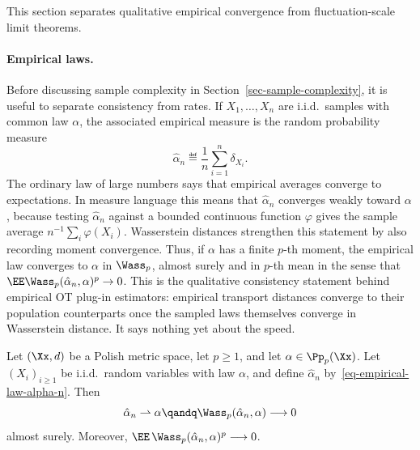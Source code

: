 This section separates qualitative empirical convergence from fluctuation-scale limit theorems.

\paragraph{Empirical laws.}
Before discussing sample complexity in Section~\ref{sec-sample-complexity}, it is useful to separate consistency from rates. If \(X_1,\ldots,X_n\) are i.i.d.\ samples with common law \(\alpha\), the associated empirical measure is the random probability measure
\begin{equation}\label{eq-empirical-law-alpha-n}
	\hat\alpha_n \eqdef \frac1n\sum_{i=1}^n\delta_{X_i}.
\end{equation}
The ordinary law of large numbers says that empirical averages converge to expectations. In measure language this means that \(\hat\alpha_n\) converges weakly toward \(\alpha\), because testing \(\hat\alpha_n\) against a bounded continuous function \(\varphi\) gives the sample average \(n^{-1}\sum_i\varphi(X_i)\). Wasserstein distances strengthen this statement by also recording moment convergence. Thus, if \(\alpha\) has a finite \(p\)-th moment, the empirical law converges to \(\alpha\) in \(\Wass_p\), almost surely and in \(p\)-th mean in the sense that \(\EE\Wass_p(\hat\alpha_n,\alpha)^p\to0\). This is the qualitative consistency statement behind empirical OT plug-in estimators: empirical transport distances converge to their population counterparts once the sampled laws themselves converge in Wasserstein distance. It says nothing yet about the speed.

\begin{prop}\label{prop-empirical-lln-wasserstein}
	Let \((\Xx,d)\) be a Polish metric space, let \(p\geq1\), and let \(\alpha\in\Pp_p(\Xx)\). Let \((X_i)_{i\geq1}\) be i.i.d.\ random variables with law \(\alpha\), and define \(\hat\alpha_n\) by~\eqref{eq-empirical-law-alpha-n}. Then
	\[
		\hat\alpha_n\rightharpoonup\alpha
		\qandq
		\Wass_p(\hat\alpha_n,\alpha)\longrightarrow0
	\]
	almost surely. Moreover,
	$\EE\,\Wass_p(\hat\alpha_n,\alpha)^p\longrightarrow0$.
\end{prop}

